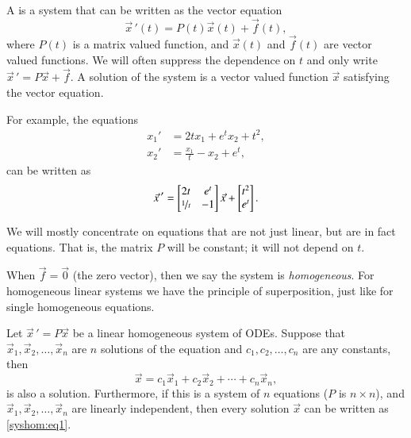 \documentclass[12pt]{book}
\begin{document}
A \emph{} is a system that can be
written as the vector equation
\begin{equation*}
{\vec{x}\,}'(t) = P(t)\vec{x}(t) + \vec{f}(t),
\end{equation*}
where $P(t)$ is a matrix valued function,
and $\vec{x}(t)$ and $\vec{f}(t)$ are vector
valued functions.  We will often suppress the dependence on $t$ and
only write ${\vec{x}\,}' = P\vec{x} + \vec{f}$.  A solution of
the system is a vector
valued function $\vec{x}$ satisfying the vector equation.

For example, the equations
\begin{align*}
x_1' &= 2t x_1 + e^t x_2 + t^2 , \\
x_2' &= \frac{x_1}{t} -x_2 + e^t ,
\end{align*}
can be written as
\begin{equation*}
{\vec{x}\,}' = 
\begin{bmatrix}
2t & e^t \\
\nicefrac{1}{t} & -1
\end{bmatrix}
\vec{x}
+
\begin{bmatrix}
t^2 \\
e^t
\end{bmatrix} .
\end{equation*}

We will mostly concentrate on equations that are not just linear, but are in
fact \emph{} equations.  That is, the matrix $P$ will
be constant; it will not depend on $t$.

\medskip

When $\vec{f} = \vec{0}$ (the zero vector), then we say the system is
\emph{homogeneous}.
For homogeneous linear systems we have the
principle of superposition, just like for single homogeneous equations.

\begin{theorem}[Superposition]
Let
${\vec{x}\,}' = P\vec{x}$ be a linear homogeneous system of ODEs.  Suppose
that $\vec{x}_1,\vec{x}_2,\ldots,\vec{x}_n$ are $n$ solutions of the equation
and $c_1,c_2,\ldots,c_n$ are any constants, then
\begin{equation} \label{syshom:eq1}
\vec{x} = c_1 \vec{x}_1 + c_2 \vec{x}_2 + \cdots + c_n \vec{x}_n ,
\end{equation}
is also a solution.
Furthermore, if this is a system of $n$ equations ($P$ is $n\times n$), and
$\vec{x}_1,\vec{x}_2,\ldots,\vec{x}_n$ are linearly independent, then every
solution  $\vec{x}$ can be written as \eqref{syshom:eq1}.
\end{theorem}
\end{document}
